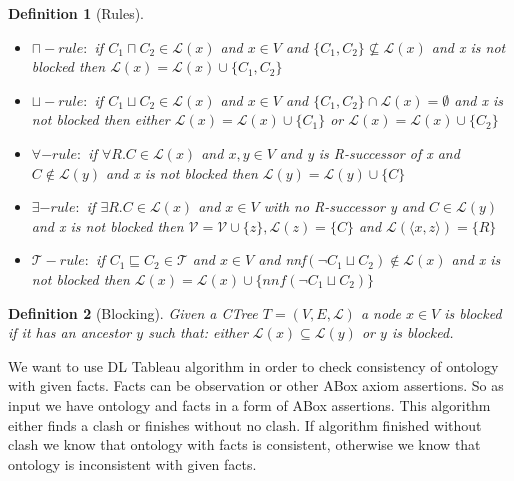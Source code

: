 \documentclass[12pt,a4paper]{article}
\newtheorem{definition}{Definition}[subsection]
\begin{document}
\begin{definition}[Rules]
~\begin{itemize}
	\item $\sqcap-rule:$ if $C_{1} \sqcap C_{2} \in \mathcal{L}(x)$ and $x \in V$ and $\{ C_{1}, C_{2} \} \not \subseteq \mathcal{L}(x)$ and x is not blocked then $\mathcal{L}(x) = \mathcal{L}(x) \cup \{ C_{1}, C_{2} \}$
	
	\item $\sqcup-rule:$ if $C_{1} \sqcup C_{2} \in \mathcal{L}(x)$ and $x \in V$ and $ \{ C_{1}, C_{2} \} \cap \mathcal{L}(x) = \emptyset$ and x is not blocked then either $\mathcal{L}(x) = \mathcal{L}(x) \cup \{ C_{1} \}$ or $\mathcal{L}(x) = \mathcal{L}(x) \cup \{ C_{2} \}$
	
	\item $\forall-rule:$ if $\forall R.C \in \mathcal{L}(x)$ and $x,y \in V$ and y is R-successor of x and $C \not \in \mathcal{L}(y)$ and x is not blocked then $\mathcal{L}(y) = \mathcal{L}(y) \cup \{ C \}$
	
	\item $\exists-rule:$ if $\exists R.C \in \mathcal{L}(x)$ and $x \in V$ with no R-successor y and $C \in \mathcal{L}(y)$ and x is not blocked then $\mathcal{V} = \mathcal{V} \cup \{ z \}, \mathcal{L}(z) = \{ C\}$ and $\mathcal{L}( \langle x, z \rangle ) = \{ R \}$
	
	\item $\mathcal{T}-rule:$ if $C_{1} \sqsubseteq C_{2} \in \mathcal{T}$ and $x \in V$ and nnf$(\neg C_{1} \sqcup C_{2}) \not \in \mathcal{L}(x)$ and x is not blocked then $\mathcal{L}(x) = \mathcal{L}(x) \cup \{ nnf(\neg C_{1} \sqcup C_{2}) \}$
\end{itemize}
\end{definition}

\begin{definition}[Blocking]
Given a CTree $T = (V, E, \mathcal{L})$ a node $x \in V$ is blocked if it has an ancestor $y$ such that: either $\mathcal{L}(x) \subseteq \mathcal{L}(y)$ or $y$ is blocked.

\end{definition}

We want to use DL Tableau algorithm in order to check consistency of ontology with given facts. Facts can be observation or other ABox axiom assertions. So as input we have ontology and facts in a form of ABox assertions. This algorithm either finds a clash or finishes without no clash. If algorithm finished without clash we know that ontology with facts is consistent, otherwise we know that ontology is inconsistent with given facts.
\end{document}
